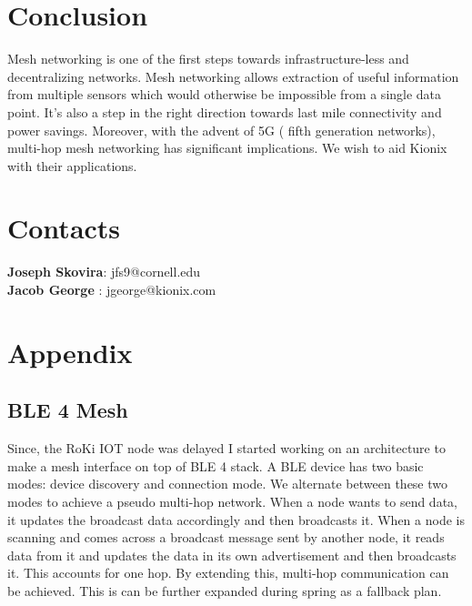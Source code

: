 \documentclass[11pt, a4paper]{article}
\begin{document}
\section {Conclusion}
Mesh networking is one of the first steps towards infrastructure-less and decentralizing networks. Mesh networking allows extraction of useful information from multiple sensors which would otherwise be impossible from a single data point. It's also a step in the right direction towards last mile connectivity and power savings. Moreover, with the advent of 5G ( fifth generation networks), multi-hop mesh networking has significant implications. We wish to aid Kionix with their applications.

\section{Contacts}

	\textbf{Joseph Skovira}:  jfs9@cornell.edu\\
	\textbf{Jacob George}  :  jgeorge@kionix.com
	
\section{Appendix}
\subsection{BLE 4 Mesh}
Since, the RoKi IOT node was delayed I started working on an architecture to make a mesh interface on top of BLE 4 stack. A BLE device has two basic modes: device discovery and connection mode. We alternate between these two modes to achieve a pseudo multi-hop network. When a node wants to send data, it updates the broadcast data accordingly and then broadcasts it. When a node is scanning and comes across a broadcast message sent by another node, it reads data from it and updates the data in its own advertisement and then broadcasts it. This accounts for one hop. By extending this, multi-hop communication can be achieved. This is can be further expanded during spring as a fallback plan. 
	
 

\end{document}
